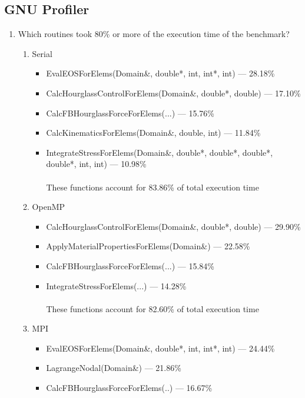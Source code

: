 \documentclass{article}
\begin{document}
\subsection{GNU Profiler} %
\begin{enumerate}
\item{Which routines took 80\% or more of the execution time of the benchmark?
}
\begin{enumerate}
	\item{Serial}
	\begin{itemize}
		\item{EvalEOSForElems(Domain\&, double*, int, int*, int) --- 28.18\%}
		\item{CalcHourglassControlForElems(Domain\&, double*, double) --- 17.10\%}
		\item{CalcFBHourglassForceForElems(...) --- 15.76\%}
		\item{CalcKinematicsForElems(Domain\&, double, int) --- 11.84\%}
		\item{IntegrateStressForElems(Domain\&, double*, double*, double*, double*, int, int) --- 10.98\%}
\\\\These functions account for 83.86\% of total execution time
	\end{itemize}
	\item{OpenMP}
	\begin{itemize}
		\item{CalcHourglassControlForElems(Domain\&, double*, double) --- 29.90\%}
		\item{ApplyMaterialPropertiesForElems(Domain\&) --- 22.58\%}
		\item{CalcFBHourglassForceForElems(...) --- 15.84\%}
		\item{IntegrateStressForElems(...) --- 14.28\% }
\\\\These functions account for 82.60\% of total execution time
	\end{itemize}
	\item{MPI}
	\begin{itemize}
		\item{EvalEOSForElems(Domain\&, double*, int, int*, int) --- 24.44\%}
		\item{LagrangeNodal(Domain\&) --- 21.86\%}
		\item{CalcFBHourglassForceForElems(..) --- 16.67\%}

\end{itemize}
\end{enumerate}
\end{enumerate}
\end{document}
